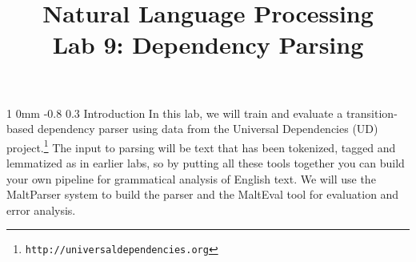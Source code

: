 \documentclass[10.9pt]{article}
\title{{\LARGE Natural Language Processing}\\[1.5mm]{\large Lab 9: Dependency Parsing}}
\author{}
\date{} %
\makeatletter
\newcommand{\newsec}[2]{\section{#1}\label{sec:#2}\noindent}
\renewcommand{\section}{\@startsection
{section}%
{1}%
{0mm}%
{-0.8\baselineskip}%
{0.3\baselineskip}%
{\bfseries\large}}%
\makeatother
\begin{document}
 

\maketitle
\vspace{-2mm}
\newsec{Introduction}{intro}%
In this lab, we will train and evaluate a transition-based dependency parser using data from the Universal Dependencies (UD) project.\footnote{{\tt http://universaldependencies.org}} The input to parsing will be text that has been tokenized, tagged and lemmatized as in earlier labs, so by putting all these tools together you can build your own pipeline for grammatical analysis of English text. We will use the MaltParser system to build the parser and the MaltEval tool for evaluation and error analysis. 
\end{document}
